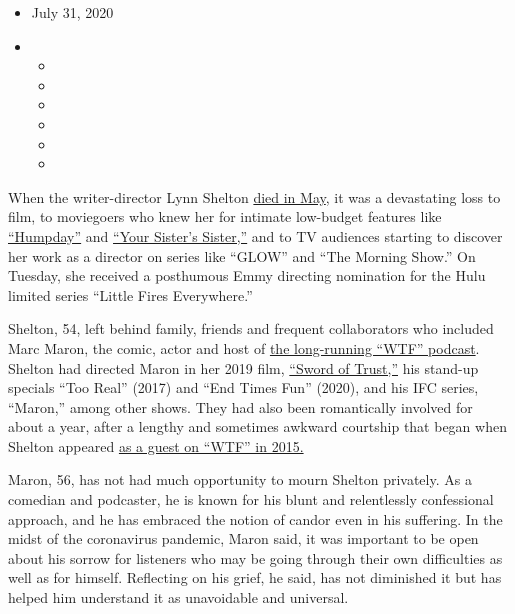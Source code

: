 \begin{itemize}
\item
  July 31, 2020
\item
  \begin{itemize}
  \item
  \item
  \item
  \item
  \item
  \item
  \end{itemize}
\end{itemize}

When the writer-director Lynn Shelton
\href{https://www.nytimes3xbfgragh.onion/2020/05/16/obituaries/lynn-shelton-dead.html?searchResultPosition=4}{died
in May}, it was a devastating loss to film, to moviegoers who knew her
for intimate low-budget features like
\href{https://www.youtube.com/watch?v=RKy63pehrvw}{``Humpday''} and
\href{https://www.youtube.com/watch?v=wglzH4dUoLQ}{``Your Sister's
Sister,''} and to TV audiences starting to discover her work as a
director on series like ``GLOW'' and ``The Morning Show.'' On Tuesday,
she received a posthumous Emmy directing nomination for the Hulu limited
series ``Little Fires Everywhere.''

Shelton, 54, left behind family, friends and frequent collaborators who
included Marc Maron, the comic, actor and host of
\href{http://www.wtfpod.com/}{the long-running ``WTF'' podcast}. Shelton
had directed Maron in her 2019 film,
\href{https://www.youtube.com/watch?v=vWmQyBjrbfU\&t=5s}{``Sword of
Trust,''} his stand-up specials ``Too Real'' (2017) and ``End Times
Fun'' (2020), and his IFC series, ``Maron,'' among other shows. They had
also been romantically involved for about a year, after a lengthy and
sometimes awkward courtship that began when Shelton appeared
\href{http://www.wtfpod.com/podcast/episodes/episode_627_-_lynn_shelton}{as
a guest on ``WTF'' in 2015.}

Maron, 56, has not had much opportunity to mourn Shelton privately. As a
comedian and podcaster, he is known for his blunt and relentlessly
confessional approach, and he has embraced the notion of candor even in
his suffering. In the midst of the coronavirus pandemic, Maron said, it
was important to be open about his sorrow for listeners who may be going
through their own difficulties as well as for himself. Reflecting on his
grief, he said, has not diminished it but has helped him understand it
as unavoidable and universal.

